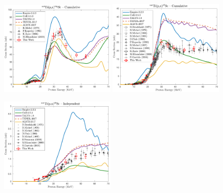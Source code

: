 \begin{figure}
 \centering
 
 \includegraphics[width=0.49\textwidth]{./figures/44Sc.pdf}
 \includegraphics[width=0.49\textwidth]{./figures/47Sc.pdf}
 
 \includegraphics[width=0.49\textwidth]{./figures/48Sc.pdf}

\vspace{-20pt} 
\end{figure}

